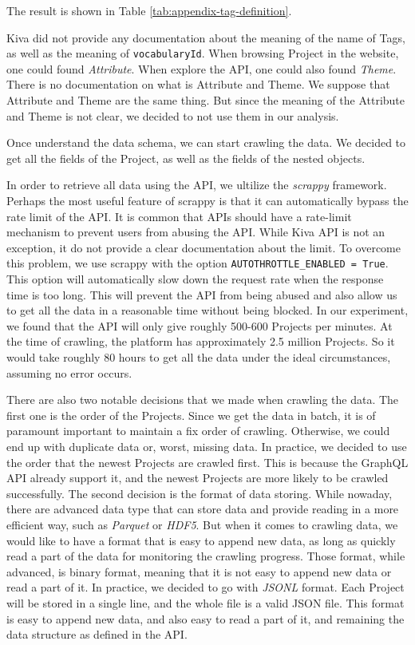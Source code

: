 The result is shown in Table \ref{tab:appendix-tag-definition}.


Kiva did not provide any documentation about the meaning of the name of Tags,
as well as the meaning of \lstinline|vocabularyId|.
When browsing Project in the website, one could found \textit{Attribute}.
When explore the API, one could also found \textit{Theme}.
There is no documentation on what is Attribute and Theme.
We suppose that Attribute and Theme are the same thing.
But since the meaning of the Attribute and Theme is not clear,
we decided to not use them in our analysis.

Once understand the data schema, we can start crawling the data.
We decided to get all the fields of the Project, as well as the fields of the nested objects.

In order to retrieve all data using the API, we ultilize the \textit{scrappy}\cite{scrappy} framework.
Perhaps the most useful feature of scrappy is that it can automatically bypass the rate limit of the API.
It is common that APIs should have a rate-limit mechanism to prevent users from abusing the API.
While Kiva API is not an exception, it do not provide a clear documentation about the limit.
To overcome this problem, we use scrappy with the option \lstinline|AUTOTHROTTLE_ENABLED = True|.
This option will automatically slow down the request rate when the response time is too long.
This will prevent the API from being abused and also allow us to get all the data in a reasonable time without being blocked.
In our experiment, we found that the API will only give roughly 500-600 Projects per minutes.
At the time of crawling, the platform has approximately 2.5 million Projects.
So it would take roughly 80 hours to get all the data under the ideal circumstances, assuming no error occurs.

There are also two notable decisions that we made when crawling the data.
The first one is the order of the Projects.
Since we get the data in batch, it is of paramount important to maintain a fix order of crawling.
Otherwise, we could end up with duplicate data or, worst, missing data.
In practice, we decided to use the order that the newest Projects are crawled first.
This is because the GraphQL API already support it, and the newest Projects are more likely to be crawled successfully.
The second decision is the format of data storing.
While nowaday, there are advanced data type that can store data and provide reading in a more efficient way,
such as \textit{Parquet}\cite{parquet} or \textit{HDF5}\cite{hdf5}.
But when it comes to crawling data, we would like to have a format that is easy to append new data,
as long as quickly read a part of the data for monitoring the crawling progress.
Those format, while advanced, is binary format, meaning that it is not easy to append new data or read a part of it.
In practice, we decided to go with \textit{JSONL} format.
Each Project will be stored in a single line, and the whole file is a valid JSON file.
This format is easy to append new data, and also easy to read a part of it, and remaining the data structure as defined in the API.

